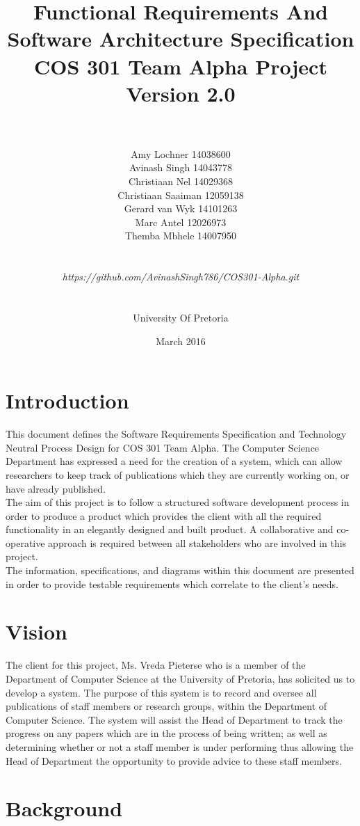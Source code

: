 \documentclass[a4paper]{article}
\title{\huge Functional Requirements And Software Architecture Specification
	\\COS 301 Team Alpha Project
	\\Version 2.0}
\author{\\\\Amy Lochner 14038600\\ Avinash Singh 14043778 \\
	Christiaan Nel 14029368\\ Christiaan Saaiman 12059138 \\
	Gerard van Wyk 14101263\\ Marc Antel 12026973\\
	Themba Mbhele 14007950
	\\
	\\
	\\\textit{https://github.com/AvinashSingh786/COS301-Alpha.git}
	\\
	\\
	\\ University Of Pretoria\\}
\date{March 2016}
\begin{document}
	
	\maketitle

	\newpage

	\tableofcontents
	\newpage
	
\section{Introduction}
	
	This document defines the Software Requirements Specification and Technology Neutral Process Design for COS 301 Team Alpha. The Computer Science Department has expressed a need for the creation of a system, which can allow researchers to keep track of publications which they are currently working on, or have already published.
	\\
	The aim of this project is to follow a structured software development process in order to produce a product which provides the client with all the required functionality in an elegantly designed and built product. A collaborative and co-operative approach is required between all stakeholders who are involved in this project. 
	\\
	The information, specifications, and diagrams within this document are presented in order to provide testable requirements which correlate to the client's needs.
	
\section{Vision}
	The client for this project, Ms. Vreda Pieterse who is a member of the Department of Computer Science at the University of Pretoria, has solicited us to develop a system. The purpose of this system is to record and oversee all publications of staff members or research groups, within the Department of Computer Science. The system will assist the Head of Department to track the progress on any papers which are in the process of being written; as well as determining whether or not a staff member is under performing thus allowing the Head of Department the opportunity to provide advice to these staff members.
	
\section{Background}
\end{document}
